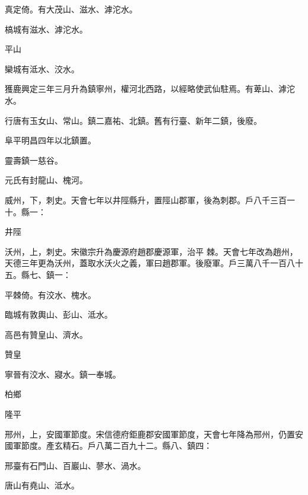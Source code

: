 \begin{pinyinscope}
 真定倚。有大茂山、滋水、滹沱水。



 槁城有滋水、滹沱水。



 平山



 欒城有泜水、洨水。



 獲鹿興定三年三月升為鎮寧州，權河北西路，以經略使武仙駐焉。有萆山、滹沱水。



 行唐有玉女山、常山。鎮二嘉祐、北鎮。舊有行臺、新年二鎮，後廢。



 阜平明昌四年以北鎮置。



 靈壽鎮一慈谷。



 元氏有封龍山、槐河。



 威州，下，刺史。天會七年以井陘縣升，置陘山郡軍，後為刺郡。戶八千三百一十。縣一：



 井陘



 沃州，上，刺史。宋徽宗升為慶源府趙郡慶源軍，治平
 棘。天會七年改為趙州，天德三年更為沃州，蓋取水沃火之義，軍曰趙郡軍。後廢軍。戶三萬八千一百八十五。縣七、鎮一：



 平棘倚。有洨水、槐水。



 臨城有敦輿山、彭山、泜水。



 高邑有贊皇山、濟水。



 贊皇



 寧晉有洨水、寢水。鎮一奉城。



 柏鄉



 隆平



 邢州，上，安國軍節度。宋信德府鉅鹿郡安國軍節度，天會七年降為邢州，仍置安國軍節度。產玄精石。戶八萬二百九十二。縣八、鎮四：



 邢臺有石門山、百巖山、蓼水、渦水。



 唐山有堯山、泜水。




\end{pinyinscope}

